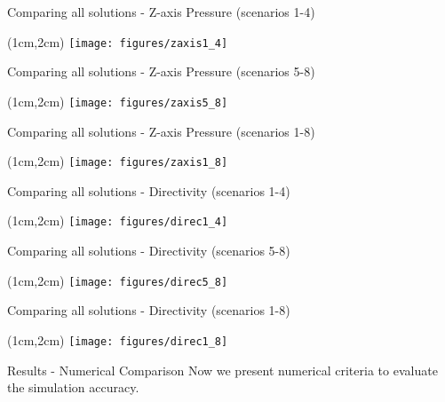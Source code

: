 \documentclass{beamer}
\begin{document}
\begin{frame}{Comparing all solutions - Z-axis Pressure (scenarios 1-4)}
\begin{textblock*}{\textwidth}(1cm,2cm)
	\texttt{[image: figures/zaxis1\_4]}
\end{textblock*}
\end{frame}

\begin{frame}{Comparing all solutions - Z-axis Pressure (scenarios 5-8)}
\begin{textblock*}{\textwidth}(1cm,2cm)
	\texttt{[image: figures/zaxis5\_8]}
\end{textblock*}
\end{frame}

\begin{frame}{Comparing all solutions - Z-axis Pressure (scenarios 1-8)}
\begin{textblock*}{\textwidth}(1cm,2cm)
	\texttt{[image: figures/zaxis1\_8]}
\end{textblock*}
\end{frame}

\begin{frame}{Comparing all solutions - Directivity (scenarios 1-4)}
\begin{textblock*}{\textwidth}(1cm,2cm)
	\texttt{[image: figures/direc1\_4]}
\end{textblock*}
\end{frame}

\begin{frame}{Comparing all solutions - Directivity (scenarios 5-8)}
\begin{textblock*}{\textwidth}(1cm,2cm)
	\texttt{[image: figures/direc5\_8]}
\end{textblock*}
\end{frame}

\begin{frame}{Comparing all solutions - Directivity (scenarios 1-8)}
\begin{textblock*}{\textwidth}(1cm,2cm)
	\texttt{[image: figures/direc1\_8]}
\end{textblock*}
\end{frame}

\begin{frame}{Results - Numerical Comparison}
Now we present numerical criteria to evaluate the simulation accuracy.
\end{frame}
\end{document}
